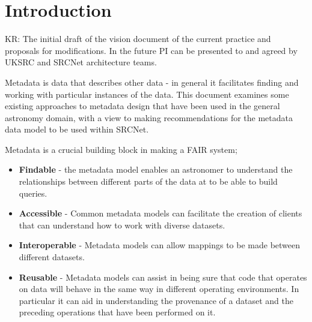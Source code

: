 \section{Introduction}\label{sec:intro}

KR: The initial draft of the vision document of the current practice and proposals for modifications. In the future PI can be presented to and agreed by UKSRC and SRCNet architecture teams.


Metadata is data that describes other data - in general it facilitates finding and working with particular instances of the data. This document examines some existing approaches to metadata design that have been used in the general astronomy domain, with a view to making recommendations for the metadata data model to be used within SRCNet.

Metadata is a crucial building block in making a FAIR system;
\begin{itemize}
    \item \textbf{Findable} - the metadata model enables an astronomer to understand the relationships between different parts of the data at to be able to build queries.
    \item \textbf{Accessible} - Common metadata models can facilitate the creation of clients that can understand how to work with diverse datasets.
    \item \textbf{Interoperable} - Metadata models can allow mappings to be made between different datasets.
    \item \textbf{Reusable} - Metadata models can assist in being sure that code that operates on data will behave in the same way in different operating environments. In particular it can aid in understanding the provenance of a dataset and the preceding operations that have been performed on it. 
    
\end{itemize}